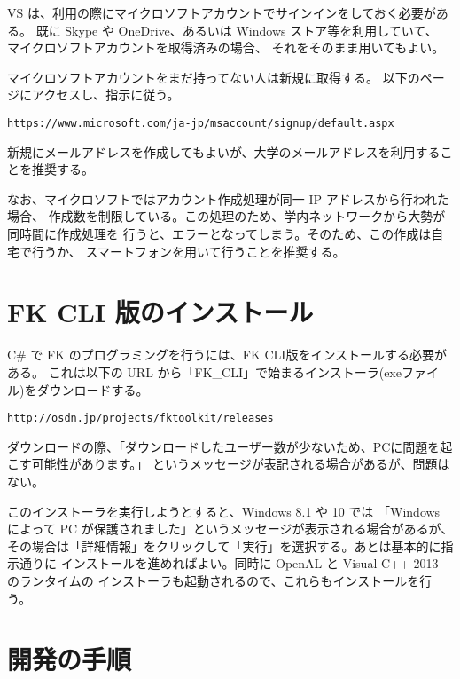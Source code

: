 \documentclass[a4paper]{jsarticle}
\begin{document}
VS は、利用の際にマイクロソフトアカウントでサインインをしておく必要がある。
既に Skype や OneDrive、あるいは Windows ストア等を利用していて、
マイクロソフトアカウントを取得済みの場合、
それをそのまま用いてもよい。

マイクロソフトアカウントをまだ持ってない人は新規に取得する。
以下のページにアクセスし、指示に従う。
\begin{screen}
\begin{center}
	\verb+https://www.microsoft.com/ja-jp/msaccount/signup/default.aspx+
\end{center}
\end{screen}
新規にメールアドレスを作成してもよいが、大学のメールアドレスを利用することを推奨する。

なお、マイクロソフトではアカウント作成処理が同一 IP アドレスから行われた場合、
作成数を制限している。この処理のため、学内ネットワークから大勢が同時間に作成処理を
行うと、エラーとなってしまう。そのため、この作成は自宅で行うか、
スマートフォンを用いて行うことを推奨する。

\section{FK CLI 版のインストール}

C\# で FK のプログラミングを行うには、FK CLI版をインストールする必要がある。
これは以下の URL から「FK\_CLI」で始まるインストーラ(exeファイル)をダウンロードする。

\begin{screen}
\begin{center}
	\verb+http://osdn.jp/projects/fktoolkit/releases+
\end{center}
\end{screen}
ダウンロードの際、「ダウンロードしたユーザー数が少ないため、PCに問題を起こす可能性があります。」
というメッセージが表記される場合があるが、問題はない。

このインストーラを実行しようとすると、Windows 8.1 や 10 では
「Windows によって PC が保護されました」というメッセージが表示される場合があるが、
その場合は「詳細情報」をクリックして「実行」を選択する。あとは基本的に指示通りに
インストールを進めればよい。同時に OpenAL と Visual C++ 2013 のランタイムの
インストーラも起動されるので、これらもインストールを行う。

\section{開発の手順}
\end{document}
